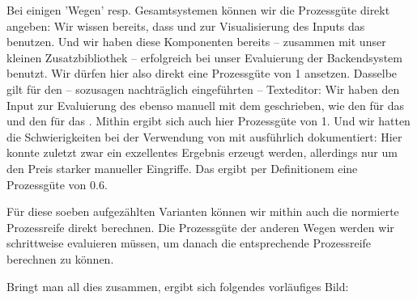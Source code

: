 Bei einigen 'Wegen' resp. Gesamtsystemen können wir die Prozessgüte direkt
angeben: Wir wissen bereits, dass  und  zur
Visualisierung des Inputs das  benutzen. Und wir haben
diese Komponenten bereits -- zusammen mit unser kleinen Zusatzbibliothek --
erfolgreich bei unser Evaluierung der Backendsystem benutzt. Wir dürfen hier
also direkt eine Prozessgüte von 1 ansetzen. Dasselbe gilt für den -- sozusagen
nachträglich eingeführten -- Texteditor: Wir haben den Input zur Evaluierung des
 ebenso manuell mit dem 
geschrieben, wie den für das  und den für das
. Mithin ergibt sich auch hier Prozessgüte von 1.
Und wir hatten die Schwierigkeiten bei der Verwendung von  mit
 ausführlich dokumentiert: Hier konnte zuletzt zwar ein
exzellentes Ergebnis erzeugt werden, allerdings nur um den Preis starker
manueller Eingriffe. Das ergibt per Definitionem eine Prozessgüte von $0.6$.

Für diese soeben aufgezählten Varianten können wir mithin auch die normierte
Prozessreife direkt berechnen. Die Prozessgüte der anderen Wegen werden wir
schrittweise evaluieren müssen, um danach die entsprechende Prozessreife
berechnen zu können.

Bringt man all dies zusammen, ergibt sich folgendes vorläufiges Bild:

